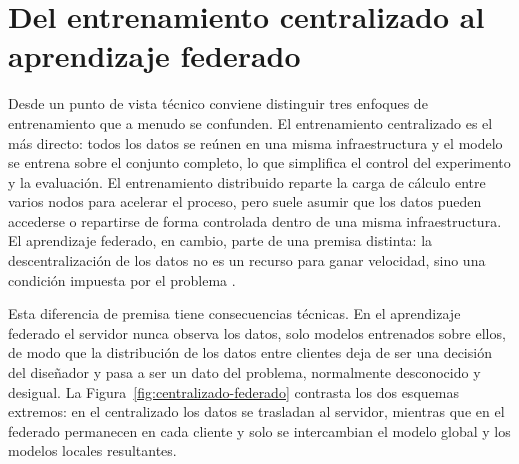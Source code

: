 \section{Del entrenamiento centralizado al aprendizaje federado}\label{sec:centralizado-distribuido}

Desde un punto de vista técnico conviene distinguir tres enfoques de entrenamiento que a
menudo se confunden. El entrenamiento centralizado es el más directo: todos los datos se
reúnen en una misma infraestructura y el modelo se entrena sobre el conjunto completo, lo
que simplifica el control del experimento y la evaluación. El entrenamiento distribuido
reparte la carga de cálculo entre varios nodos para acelerar el proceso, pero suele
asumir que los datos pueden accederse o repartirse de forma controlada dentro de una
misma infraestructura. El aprendizaje federado, en cambio, parte de una premisa distinta:
la descentralización de los datos no es un recurso para ganar velocidad, sino una
condición impuesta por el problema \parencite{kairouz2021advances}.

Esta diferencia de premisa tiene consecuencias técnicas. En el aprendizaje federado el
servidor nunca observa los datos, solo modelos entrenados sobre ellos, de modo que la
distribución de los datos entre clientes deja de ser una decisión del diseñador y pasa a
ser un dato del problema, normalmente desconocido y desigual. La
Figura~\ref{fig:centralizado-federado} contrasta los dos esquemas extremos: en el
centralizado los datos se trasladan al servidor, mientras que en el federado permanecen
en cada cliente y solo se intercambian el modelo global y los modelos locales
resultantes.

